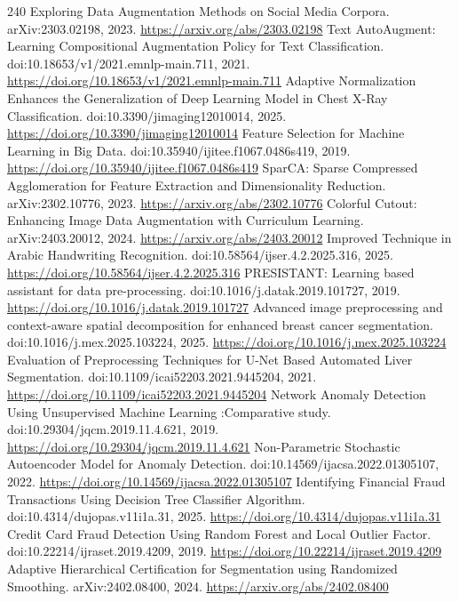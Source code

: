 \documentclass[11pt]{article}
\begin{document}
\begin{thebibliography}{240}
 Exploring Data Augmentation Methods on Social Media Corpora. arXiv:2303.02198, 2023. \url{https://arxiv.org/abs/2303.02198}
 Text AutoAugment: Learning Compositional Augmentation Policy for Text Classification. doi:10.18653/v1/2021.emnlp-main.711, 2021. \url{https://doi.org/10.18653/v1/2021.emnlp-main.711}
 Adaptive Normalization Enhances the Generalization of Deep Learning Model in Chest X-Ray Classification. doi:10.3390/jimaging12010014, 2025. \url{https://doi.org/10.3390/jimaging12010014}
 Feature Selection for Machine Learning in Big Data. doi:10.35940/ijitee.f1067.0486s419, 2019. \url{https://doi.org/10.35940/ijitee.f1067.0486s419}
 SparCA: Sparse Compressed Agglomeration for Feature Extraction and Dimensionality Reduction. arXiv:2302.10776, 2023. \url{https://arxiv.org/abs/2302.10776}
 Colorful Cutout: Enhancing Image Data Augmentation with Curriculum Learning. arXiv:2403.20012, 2024. \url{https://arxiv.org/abs/2403.20012}
 Improved Technique in Arabic Handwriting Recognition. doi:10.58564/ijser.4.2.2025.316, 2025. \url{https://doi.org/10.58564/ijser.4.2.2025.316}
 PRESISTANT: Learning based assistant for data pre-processing. doi:10.1016/j.datak.2019.101727, 2019. \url{https://doi.org/10.1016/j.datak.2019.101727}
 Advanced image preprocessing and context-aware spatial decomposition for enhanced breast cancer segmentation. doi:10.1016/j.mex.2025.103224, 2025. \url{https://doi.org/10.1016/j.mex.2025.103224}
 Evaluation of Preprocessing Techniques for U-Net Based Automated Liver Segmentation. doi:10.1109/icai52203.2021.9445204, 2021. \url{https://doi.org/10.1109/icai52203.2021.9445204}
 Network Anomaly Detection Using Unsupervised Machine Learning :Comparative study. doi:10.29304/jqcm.2019.11.4.621, 2019. \url{https://doi.org/10.29304/jqcm.2019.11.4.621}
 Non-Parametric Stochastic Autoencoder Model for Anomaly Detection. doi:10.14569/ijacsa.2022.01305107, 2022. \url{https://doi.org/10.14569/ijacsa.2022.01305107}
 Identifying Financial Fraud Transactions Using Decision Tree Classifier Algorithm. doi:10.4314/dujopas.v11i1a.31, 2025. \url{https://doi.org/10.4314/dujopas.v11i1a.31}
 Credit Card Fraud Detection Using Random Forest and Local Outlier Factor. doi:10.22214/ijraset.2019.4209, 2019. \url{https://doi.org/10.22214/ijraset.2019.4209}
 Adaptive Hierarchical Certification for Segmentation using Randomized Smoothing. arXiv:2402.08400, 2024. \url{https://arxiv.org/abs/2402.08400}

\end{thebibliography}
\end{document}
